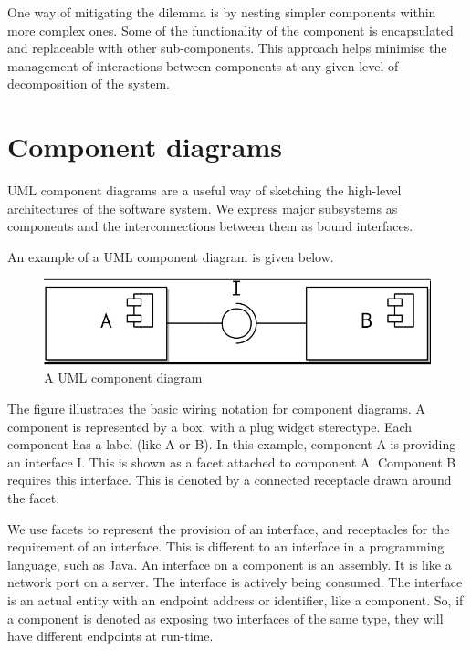 \documentclass[a4paper, openany]{memoir}
\begin{document}
One way of mitigating the dilemma is by nesting simpler components within more complex ones. Some of the functionality of the component is encapsulated and replaceable with other sub-components. This approach helps minimise the management of interactions between components at any given level of decomposition of the system.

\section{Component diagrams}
UML component diagrams are a useful way of sketching the high-level architectures of the software system. We express major subsystems as components and the interconnections between them as bound interfaces. 

An example of a UML component diagram is given below.
\begin{figure}[H]
    \centering
    \includegraphics[scale=0.4]{src/14.1 UML Example.png}
    \caption{A UML component diagram}
\end{figure}
\noindent The figure illustrates the basic wiring notation for component diagrams. A component is represented by a box, with a plug widget stereotype. Each component has a label (like A or B). In this example, component A is providing an interface I. This is shown as a facet attached to component A. Component B requires this interface. This is denoted by a connected receptacle drawn around the facet.

We use facets to represent the provision of an interface, and receptacles for the requirement of an interface. This is different to an interface in a programming language, such as Java. An interface on a component is an assembly. It is like a network port on a server. The interface is actively being consumed. The interface is an actual entity with an endpoint address or identifier, like a component. So, if a component is denoted as exposing two interfaces of the same type, they will have different endpoints at run-time.
\end{document}
